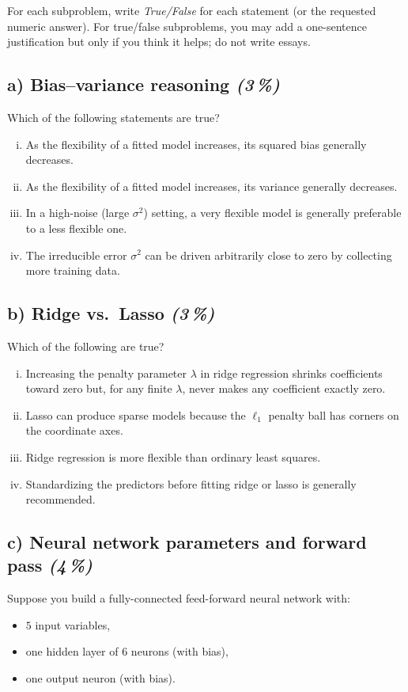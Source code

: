 \documentclass[11pt,a4paper]{article}
\newcommand{\subpoints}[1]{\textit{(#1\,\%)}}
\begin{document}
For each subproblem, write \emph{True/False} for each statement (or the requested numeric answer). For true/false subproblems, you may add a one-sentence justification but only if you think it helps; do not write essays.

\subsection*{a) Bias--variance reasoning \subpoints{3}}
Which of the following statements are true?
\begin{enumerate}[(i)]
  \item As the flexibility of a fitted model increases, its squared bias generally decreases.
  \item As the flexibility of a fitted model increases, its variance generally decreases.
  \item In a high-noise (large $\sigma^2$) setting, a very flexible model is generally preferable to a less flexible one.
  \item The irreducible error $\sigma^2$ can be driven arbitrarily close to zero by collecting more training data.
\end{enumerate}

\subsection*{b) Ridge vs.\ Lasso \subpoints{3}}
Which of the following are true?
\begin{enumerate}[(i)]
  \item Increasing the penalty parameter $\lambda$ in ridge regression shrinks coefficients toward zero but, for any finite $\lambda$, never makes any coefficient exactly zero.
  \item Lasso can produce sparse models because the $\ell_1$ penalty ball has corners on the coordinate axes.
  \item Ridge regression is more flexible than ordinary least squares.
  \item Standardizing the predictors before fitting ridge or lasso is generally recommended.
\end{enumerate}

\subsection*{c) Neural network parameters and forward pass \subpoints{4}}
Suppose you build a fully-connected feed-forward neural network with:
\begin{itemize}
  \item $5$ input variables,
  \item one hidden layer of $6$ neurons (with bias),
  \item one output neuron (with bias).
\end{itemize}
\end{document}
